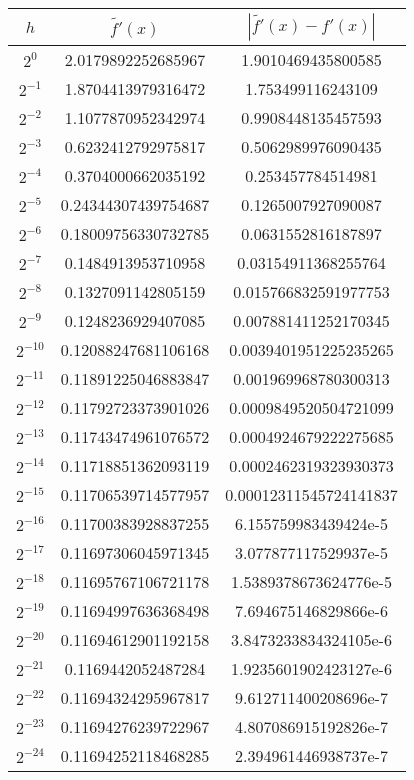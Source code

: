 \documentclass{article}
\begin{document}
\begin{longtable}[c]{|c|c|c|}
  \hline
  $h$ & $\widetilde{f'}(x)$ & $|\widetilde{f'}(x) - f'(x)|$ \\
  \hline
  $2^{0}$ & 2.0179892252685967 & 1.9010469435800585 \\
  $2^{-1}$ & 1.8704413979316472 & 1.753499116243109 \\
  $2^{-2}$ & 1.1077870952342974 & 0.9908448135457593 \\
  $2^{-3}$ & 0.6232412792975817 & 0.5062989976090435 \\
  $2^{-4}$ & 0.3704000662035192 & 0.253457784514981 \\
  $2^{-5}$ & 0.24344307439754687 & 0.1265007927090087 \\
  $2^{-6}$ & 0.18009756330732785 & 0.0631552816187897 \\
  $2^{-7}$ & 0.1484913953710958 & 0.03154911368255764 \\
  $2^{-8}$ & 0.1327091142805159 & 0.015766832591977753 \\
  $2^{-9}$ & 0.1248236929407085 & 0.007881411252170345 \\
  $2^{-10}$ & 0.12088247681106168 & 0.0039401951225235265 \\
  $2^{-11}$ & 0.11891225046883847 & 0.001969968780300313 \\
  $2^{-12}$ & 0.11792723373901026 & 0.0009849520504721099 \\
  $2^{-13}$ & 0.11743474961076572 & 0.0004924679222275685 \\
  $2^{-14}$ & 0.11718851362093119 & 0.0002462319323930373 \\
  $2^{-15}$ & 0.11706539714577957 & 0.00012311545724141837 \\
  $2^{-16}$ & 0.11700383928837255 & 6.155759983439424e-5 \\
  $2^{-17}$ & 0.11697306045971345 & 3.077877117529937e-5 \\
  $2^{-18}$ & 0.11695767106721178 & 1.5389378673624776e-5 \\
  $2^{-19}$ & 0.11694997636368498 & 7.694675146829866e-6 \\
  $2^{-20}$ & 0.11694612901192158 & 3.8473233834324105e-6 \\
  $2^{-21}$ & 0.1169442052487284 & 1.9235601902423127e-6 \\
  $2^{-22}$ & 0.11694324295967817 & 9.612711400208696e-7 \\
  $2^{-23}$ & 0.11694276239722967 & 4.807086915192826e-7 \\
  $2^{-24}$ & 0.11694252118468285 & 2.394961446938737e-7 \\

\end{longtable}
\end{document}
